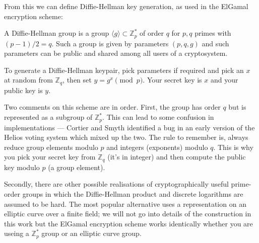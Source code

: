 \documentclass{llncs}
\begin{document}
From this we can define Diffie-Hellman key generation, as used in the ElGamal
encryption scheme:

\begin{definition}
A Diffie-Hellman group is a group $\langle g \rangle \subset \mathbb Z^*_p$ of
order $q$ for $p, q$ primes with $(p-1)/2 = q$. Such a group is given by
parameters $(p, q, g)$ and such parameters can be public and shared among all
users of a cryptosystem.

To generate a Diffie-Hellman keypair, pick parameters if required and pick an
$x$ at random from $\mathbb Z_q$, then set $y = g^x \pmod{p}$. Your secret key
is $x$ and your public key is $y$.
\end{definition}

Two comments on this scheme are in order. First, the group has order $q$ but is
represented as a subgroup of $\mathbb Z^*_p$. This can lead to some confusion
in implementations --- Cortier and Smyth \cite{CS???} identified a bug in an
early version of the Helios voting system which mixed up the two. The rule to
remember is, always reduce group elements modulo $p$ and integers (exponents)
modulo $q$. This is why you pick your secret key from $\mathbb Z_q$ (it's in
integer) and then compute the public key modulo $p$ (a group element).

Secondly, there are other possible realisations of cryptographically useful
prime-order groups in which the Diffie-Hellman product and discrete logarithms
are assumed to be hard. The most popular alternative uses a representation on an
elliptic curve over a finite field; we will not go into details of the
construction in this work but the ElGamal encryption scheme works identically
whether you are useing a $\mathbb Z^*_p$ group or an elliptic curve group.
\end{document}

